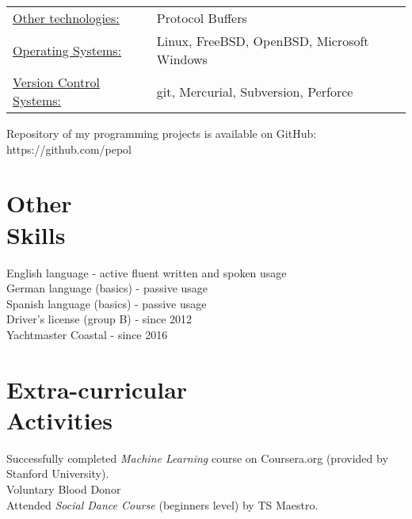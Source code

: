 \documentclass[margin]{res}
\begin{document}
\begin{resume}
\begin{tabular}{l p{3in}}
       \underline{Other technologies:} & Protocol Buffers \\
       \underline{Operating Systems:} & Linux, FreeBSD, OpenBSD, Microsoft Windows \\
       \underline{Version Control Systems:} & git, Mercurial, Subversion, Perforce
 \end{tabular}

Repository of my programming projects is available on GitHub: https://github.com/pepol

\section{Other \\ Skills}
English language - active fluent written and spoken usage \\
German language (basics) - passive usage \\
Spanish language (basics) - passive usage \\
Driver's license (group B) - since 2012 \\
Yachtmaster Coastal - since 2016

\section{Extra-curricular \\ Activities}
Successfully completed {\it Machine Learning} course on Coursera.org (provided by Stanford University). \\
Voluntary Blood Donor \\
Attended {\it Social Dance Course} (beginners level) by TS Maestro.
\end{resume}
\end{document}
